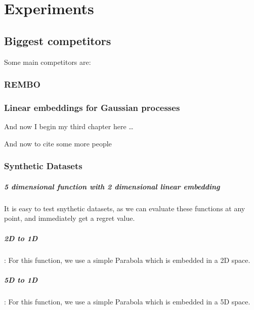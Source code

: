 \chapter{Experiments}

\ifpdf
    \graphicspath{{Chapter3/Figs/Raster/}{Chapter3/Figs/PDF/}{Chapter3/Figs/}}
\else
    \graphicspath{{Chapter3/Figs/Vector/}{Chapter3/Figs/}}
\fi

\section{Biggest competitors}
Some main competitors are:

\subsection{REMBO}

\subsection{Linear embeddings for Gaussian processes}
And now I begin my third chapter here \dots

And now to cite some more people~\citet{Rea85,Ancey1996}

\subsection{Synthetic Datasets}
\paragraph{5 dimensional function with 2 dimensional linear embedding}

It is easy to test snythetic datasets, as we can evaluate these functions at any point, and immediately get a regret value.

\paragraph{2D to 1D}: For this function, we use a simple Parabola which is embedded in a 2D space.
\paragraph{5D to 1D}: For this function, we use a simple Parabola which is embedded in a 5D space.
